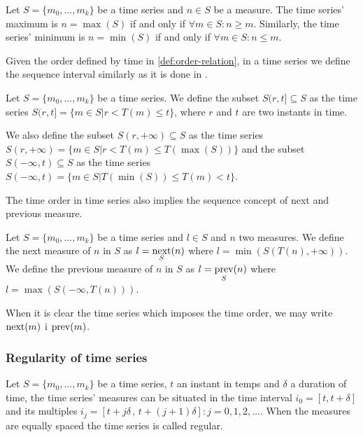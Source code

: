 \begin{definition}
  Let $S=\{m_0,\ldots,m_k\}$ be a time series and $n\in S$ be a
  measure. The time series' maximum is $n=\max(S)$ if and only if
  $\forall m \in S: n \geq m $.  Similarly, the time series' minimum
  is $n=\min(S)$ if and only if $\forall m \in S: n \leq m$.
\end{definition}

Given the order defined by time in \ref{def:order-relation}, in a time
series we define the sequence interval similarly as it is done in \cite{last:keogh,last:hetland}.

\begin{definition}
  Let $S=\{m_0, \ldots, m_k\}$ be a time series. We define the subset
  $S(r,t] \subseteq S$ as the time series $S(r,t]=\{m\in S |
  r<T(m)\leq t\}$, where $r$ and $t$ are two instants in time.

  We also define the subset $S(r,+\infty)\subseteq S$ as the time
  series $S(r,+\infty) = \{m\in S | r< T(m) \leq T(\max(S))\}$ and the
  subset $S(-\infty,t)\subseteq S$ as the time series $S(-\infty,t) =
  \{m\in S | T(\min(S))\leq T(m) < t\}$.
\end{definition}

The time order in time series also implies the sequence concept of
next and previous measure.

\begin{definition}
  Let $S=\{m_0, \ldots, m_k\}$ be a time series and $l\in S$ and $n$
  two measures. We define the next measure of $n$ in $S$ as
  $l=\operatorname*{next}\limits_S(n)$ where $l = \min(S(T(n),+\infty))$. We define
  the previous measure of $n$ in $S$ as $l=\operatorname*{prev}\limits_S(n)$ where $l =
  \max(S(-\infty,T(n)))$.
\end{definition}

When it is clear the time series which imposes the time order, we may
write $\operatorname*{next}(m)$ i $\operatorname*{prev}(m)$.



\subsubsection{Regularity of time series} 

Let $S=\{m_0,\ldots,m_k\}$ be a time series, $t$ an instant in temps
and $\delta$ a duration of time, the time series' measures can be
situated in the time interval $i_0=[t,t+\delta]$ and its multiples
$i_j=[t+j\delta \,,\, t+(j+1)\delta]: j=0,1,2,\ldots$. When the
measures are equally spaced the time series is called regular.


